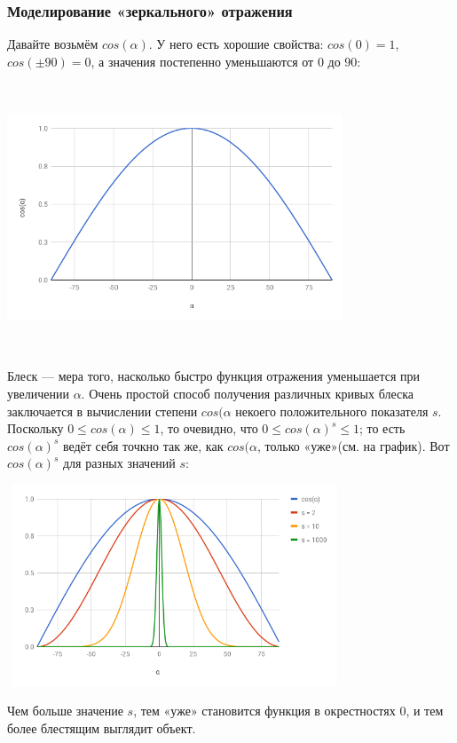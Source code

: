 \newpage
\subsubsection{Моделирование «зеркального» отражения}

Давайте возьмём $cos(\alpha)$. У него есть хорошие свойства: $cos(0) = 1$, $cos(\pm 90) = 0$, а значения постепенно уменьшаются от $0$ до $90$:

\includegraphics[width=10cm, height=8cm]{cos.png}

Блеск — мера того, насколько быстро функция отражения уменьшается при увеличении $\alpha$. Очень простой способ получения различных кривых блеска заключается в вычислении степени $cos(\alpha$ некоего положительного показателя $s$. Поскольку $0 \le cos(\alpha) \le 1$, то очевидно, что $0 \le cos(\alpha)^s \le 1$; то есть $cos(\alpha)^s$ ведёт себя точкно так же, как $cos(\alpha$, только «уже»(см. на график). Вот $cos(\alpha)^s$ для разных значений $s$:

\includegraphics[width=10cm, height=6cm]{cos1.png}

Чем больше значение $s$, тем «уже» становится функция в окрестностях $0$, и тем более блестящим выглядит объект.

